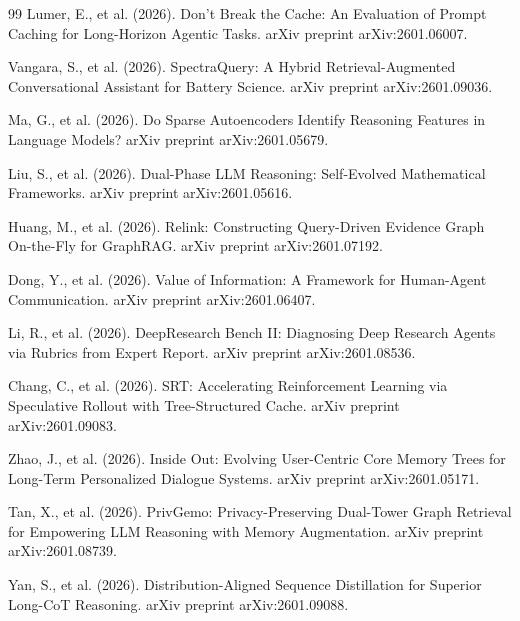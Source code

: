 \documentclass{article}
\begin{document}
\begin{thebibliography}{99}
Lumer, E., et al. (2026). Don't Break the Cache: An Evaluation of Prompt Caching for Long-Horizon Agentic Tasks. arXiv preprint arXiv:2601.06007.

Vangara, S., et al. (2026). SpectraQuery: A Hybrid Retrieval-Augmented Conversational Assistant for Battery Science. arXiv preprint arXiv:2601.09036.

Ma, G., et al. (2026). Do Sparse Autoencoders Identify Reasoning Features in Language Models? arXiv preprint arXiv:2601.05679.

Liu, S., et al. (2026). Dual-Phase LLM Reasoning: Self-Evolved Mathematical Frameworks. arXiv preprint arXiv:2601.05616.

Huang, M., et al. (2026). Relink: Constructing Query-Driven Evidence Graph On-the-Fly for GraphRAG. arXiv preprint arXiv:2601.07192.

Dong, Y., et al. (2026). Value of Information: A Framework for Human-Agent Communication. arXiv preprint arXiv:2601.06407.

Li, R., et al. (2026). DeepResearch Bench II: Diagnosing Deep Research Agents via Rubrics from Expert Report. arXiv preprint arXiv:2601.08536.

Chang, C., et al. (2026). SRT: Accelerating Reinforcement Learning via Speculative Rollout with Tree-Structured Cache. arXiv preprint arXiv:2601.09083.

Zhao, J., et al. (2026). Inside Out: Evolving User-Centric Core Memory Trees for Long-Term Personalized Dialogue Systems. arXiv preprint arXiv:2601.05171.

Tan, X., et al. (2026). PrivGemo: Privacy-Preserving Dual-Tower Graph Retrieval for Empowering LLM Reasoning with Memory Augmentation. arXiv preprint arXiv:2601.08739.

Yan, S., et al. (2026). Distribution-Aligned Sequence Distillation for Superior Long-CoT Reasoning. arXiv preprint arXiv:2601.09088.


\end{thebibliography}
\end{document}
